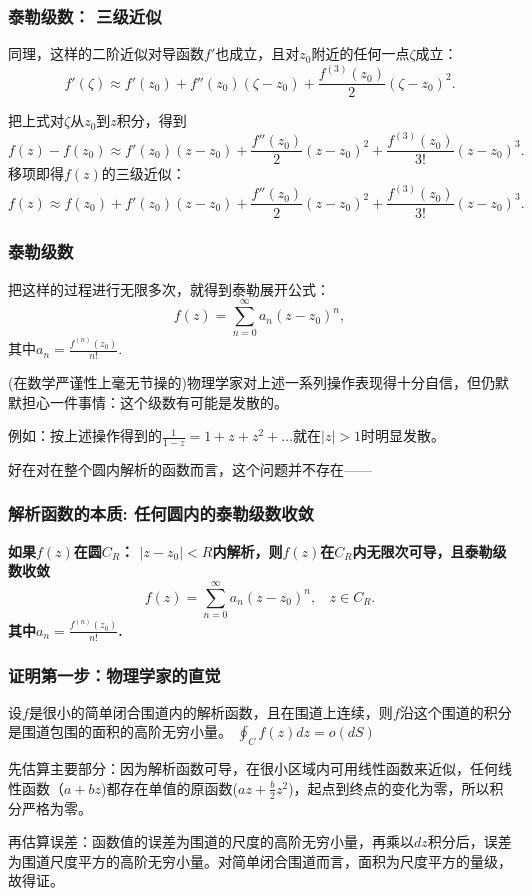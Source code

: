 \documentclass[CJK]{beamer}
\begin{document}
\begin{frame}
  \frametitle{泰勒级数： 三级近似}
  
  同理，这样的二阶近似对导函数$f'$也成立，且对$z_0$附近的任何一点$\zeta$成立：
$$    f'(\zeta) \approx f'(z_0) + f''(z_0)(\zeta-z_0) + \frac{f^{(3)}(z_0)}{2} (\zeta - z_0)^2.  $$

  把上式对$\zeta$从$z_0$到$z$积分，得到
  $$     f(z) - f(z_0)  \approx  f'(z_0)(z-z_0) + \frac{f''(z_0)}{2} (z-z_0)^2 + \frac{f^{(3)}(z_0)}{3!}(z-z_0)^3. $$
  移项即得$f(z)$的三级近似：
  \begin{equation}
    f(z)  \approx f(z_0) + f'(z_0)(z-z_0) + \frac{f''(z_0)}{2} (z-z_0)^2 + \frac{f^{(3)}(z_0)}{3!}(z-z_0)^3. \nonumber
  \end{equation}
  
  
\end{frame}


\begin{frame}
  \frametitle{泰勒级数}
  
  把这样的过程进行无限多次，就得到{\blue 泰勒展开公式：
  $$f(z) = \sum_{n=0}^\infty a_n(z-z_0)^n,$$
  其中$a_n = \frac{f^{(n)}(z_0)}{n!}$.}

  \skiplines

  (在数学严谨性上毫无节操的)物理学家对上述一系列操作表现得十分自信，但仍默默担心一件事情：这个级数有可能是发散的。

  例如：按上述操作得到的$\frac{1}{1-z} = 1+z+z^2+\ldots$就在$|z|>1$时明显发散。

  \skiplines
  
  好在对在整个圆内解析的函数而言，这个问题并不存在——
  
\end{frame}


\begin{frame}
  \frametitle{解析函数的本质: 任何圆内的泰勒级数收敛}
  
  {\blue \bf
  如果$f(z)$在圆$C_R$： $|z-z_0|< R$内解析，则$f(z)$在$C_R$内无限次可导，且泰勒级数收敛
  $$f(z) = \sum_{n=0}^\infty a_n(z-z_0)^n, \  \ \ \ z\in C_R.$$
  其中$a_n = \frac{f^{(n)}(z_0)}{n!}$.
  }
  
\end{frame}

\begin{frame}
  \frametitle{证明第一步：物理学家的直觉} 
  
      {\blue 设$f$是很小的简单闭合围道内的解析函数，且在围道上连续，则$f$沿这个围道的积分是围道包围的面积的高阶无穷小量。
        $\oint_C f(z)dz = o(dS)$
        }

  \bitem
  \item{  先估算主要部分：因为解析函数可导，在很小区域内可用线性函数来近似，任何线性函数（$a+bz$)都存在单值的原函数($az+\frac{b}{2}z^2$)，起点到终点的变化为零，所以积分严格为零。}

  \item {再估算误差：函数值的误差为围道的尺度的高阶无穷小量，再乘以$dz$积分后，误差为围道尺度平方的高阶无穷小量。对简单闭合围道而言，面积为尺度平方的量级，故得证。}
  \eitem
  
\end{frame}
\end{document}
